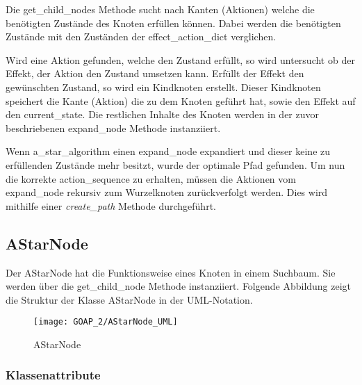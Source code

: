 

Die get\_child\_nodes Methode sucht nach Kanten (Aktionen) welche die benötigten Zustände des Knoten erfüllen können. Dabei werden die benötigten Zustände mit den Zuständen der effect\_action\_dict verglichen.

Wird eine Aktion gefunden, welche den Zustand erfüllt, so wird untersucht ob der Effekt, der Aktion den Zustand umsetzen kann. Erfüllt der Effekt den gewünschten Zustand, so wird ein Kindknoten erstellt. Dieser Kindknoten speichert die Kante (Aktion) die zu dem Knoten geführt hat, sowie den Effekt auf den current\_state. Die restlichen Inhalte des Knoten werden in der zuvor beschriebenen expand\_node Methode instanziiert.



Wenn a\_star\_algorithm einen expand\_node expandiert und dieser keine zu erfüllenden Zustände mehr besitzt, wurde der optimale Pfad gefunden. Um nun die korrekte action\_sequence zu erhalten, müssen die Aktionen vom expand\_node rekursiv zum Wurzelknoten zurückverfolgt werden. Dies wird mithilfe einer \textit{create\_path} Methode durchgeführt.



\subsection{AStarNode}

Der AStarNode hat die Funktionsweise eines Knoten in einem Suchbaum. Sie werden über die get\_child\_node Methode instanziiert. Folgende Abbildung zeigt die Struktur der Klasse AStarNode in der UML-Notation.

\begin{figure}[h]
  \centering
  \texttt{[image: GOAP\_2/AStarNode\_UML]}
	\captionsetup{justification=justified, format=plain}
  \caption{AStarNode}
  \label{AStarNode}
\end{figure}


\subsubsection{Klassenattribute}

